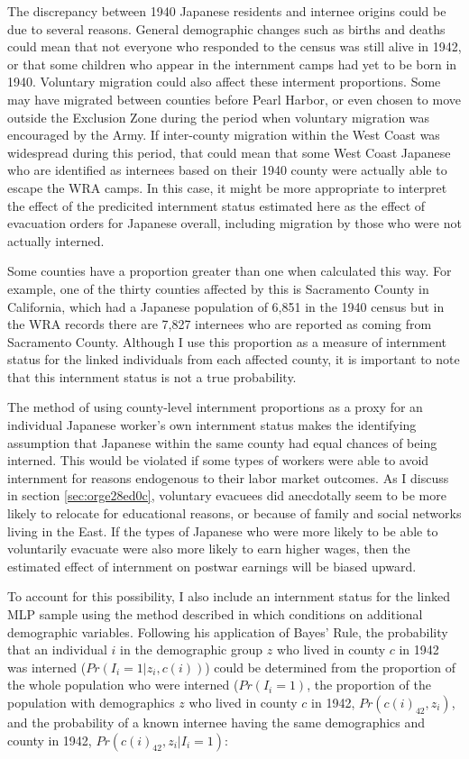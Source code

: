 \documentclass[12pt]{article}
\begin{document}
The discrepancy between 1940 Japanese residents and internee origins
could be due to several reasons.
General demographic changes such as births and deaths
could mean that not everyone who responded to the census was still alive in 1942,
or that some children who appear in the internment camps
had yet to be born in 1940.
Voluntary migration could also affect these interment proportions.
Some may have migrated between counties before Pearl Harbor,
or even chosen to move outside the Exclusion Zone
during the period when voluntary migration was encouraged by the Army.
If inter-county migration within the West Coast was widespread during this period,
that could mean that some West Coast Japanese who are identified as internees
based on their 1940 county
were actually able to escape the WRA camps.
In this case, it might be more appropriate to interpret the effect of
the predicited internment status estimated here
as the effect of evacuation orders for Japanese overall,
including migration by those who were not actually interned.

Some counties have a proportion greater than one when calculated this way.
For example, one of the thirty counties affected by this is
Sacramento County in California,
which had a Japanese population of 6,851 in the 1940 census
but in the WRA records there are 7,827 internees who are reported
as coming from Sacramento County.
Although I use this proportion as a measure of internment status
for the linked individuals from each affected county,
it is important to note that this internment status is not a true probability.

The method of using county-level internment proportions
as a proxy for an individual Japanese worker's own internment status
makes the identifying assumption that
Japanese within the same county had equal chances of being interned.
This would be violated if some types of workers were able to avoid internment
for reasons endogenous to their labor market outcomes.
As I discuss in section \ref{sec:orge28ed0c},
voluntary evacuees did anecdotally seem to be more likely to relocate
for educational reasons,
or because of family and social networks living in the East.
If the types of Japanese who were more likely to be able to voluntarily evacuate
were also more likely to earn higher wages,
then the estimated effect of internment on postwar earnings will
be biased upward.

To account for this possibility,
I also include an internment status for the linked MLP sample
using the method described in
\citet{arellano-boverDisplacementDiversityMobility2022}
which conditions on additional demographic variables.
Following his application of Bayes' Rule,
the probability that an individual \(i\)
in the demographic group \(z\) who lived in county \(c\) in 1942 was interned
(\(Pr(I_{i}=1|z_i,c(i))\))
could be determined from the proportion of the whole population who were interned
(\(Pr(I_{i}=1)\),
the proportion of the population with demographics \(z\)
who lived in county \(c\) in 1942, \(Pr(c(i)_{42}, z_i)\),
and the probability of a known internee
having the same demographics and county in 1942,
\(Pr(c(i)_{42}, z_i|I_i=1)\):
\end{document}
